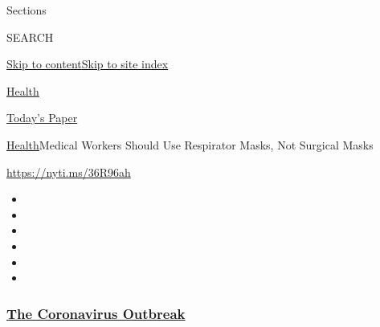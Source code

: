 Sections

SEARCH

\protect\hyperlink{site-content}{Skip to
content}\protect\hyperlink{site-index}{Skip to site index}

\href{https://www.nytimes3xbfgragh.onion/section/health}{Health}

\href{https://myaccount.nytimes3xbfgragh.onion/auth/login?response_type=cookie\&client_id=vi}{}

\href{https://www.nytimes3xbfgragh.onion/section/todayspaper}{Today's
Paper}

\href{/section/health}{Health}\textbar{}Medical Workers Should Use
Respirator Masks, Not Surgical Masks

\url{https://nyti.ms/36R96ah}

\begin{itemize}
\item
\item
\item
\item
\item
\item
\end{itemize}

\hypertarget{the-coronavirus-outbreak}{%
\subsubsection{\texorpdfstring{\href{https://www.nytimes3xbfgragh.onion/news-event/coronavirus?name=styln-coronavirus-national\&region=TOP_BANNER\&variant=undefined\&block=storyline_menu_recirc\&action=click\&pgtype=Article\&impression_id=4aab1750-e3af-11ea-aa1e-5137522d6522}{The
Coronavirus
Outbreak}}{The Coronavirus Outbreak}}\label{the-coronavirus-outbreak}}

